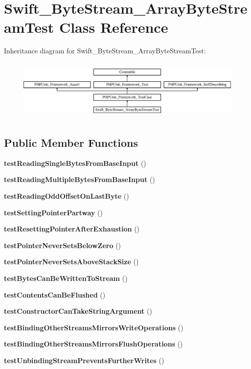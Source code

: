 \section{Swift\+\_\+\+Byte\+Stream\+\_\+\+Array\+Byte\+Stream\+Test Class Reference}
\label{class_swift___byte_stream___array_byte_stream_test}
Inheritance diagram for Swift\+\_\+\+Byte\+Stream\+\_\+\+Array\+Byte\+Stream\+Test\+:\begin{figure}[H]
\begin{center}
\leavevmode
\includegraphics[height=3.047619cm]{class_swift___byte_stream___array_byte_stream_test}
\end{center}
\end{figure}
\subsection*{Public Member Functions}
\begin{DoxyCompactItemize}
\item 
{\bf test\+Reading\+Single\+Bytes\+From\+Base\+Input} ()
\item 
{\bf test\+Reading\+Multiple\+Bytes\+From\+Base\+Input} ()
\item 
{\bf test\+Reading\+Odd\+Offset\+On\+Last\+Byte} ()
\item 
{\bf test\+Setting\+Pointer\+Partway} ()
\item 
{\bf test\+Resetting\+Pointer\+After\+Exhaustion} ()
\item 
{\bf test\+Pointer\+Never\+Sets\+Below\+Zero} ()
\item 
{\bf test\+Pointer\+Never\+Sets\+Above\+Stack\+Size} ()
\item 
{\bf test\+Bytes\+Can\+Be\+Written\+To\+Stream} ()
\item 
{\bf test\+Contents\+Can\+Be\+Flushed} ()
\item 
{\bf test\+Constructor\+Can\+Take\+String\+Argument} ()
\item 
{\bf test\+Binding\+Other\+Streams\+Mirrors\+Write\+Operations} ()
\item 
{\bf test\+Binding\+Other\+Streams\+Mirrors\+Flush\+Operations} ()
\item 
{\bf test\+Unbinding\+Stream\+Prevents\+Further\+Writes} ()
\end{DoxyCompactItemize}
